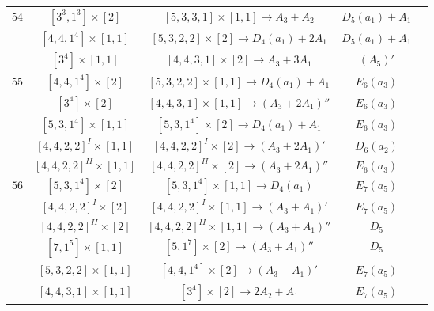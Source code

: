 \documentclass[reqno,12pt]{amsart}
\numberwithin{equation}{section}
\theoremstyle{plain}
\theoremstyle{definition}
\begin{document}
\begin{table}[htbp]
{\begin{tabular}{|c|c|c|c|c|}
$54$ 
&  $ [3^3,1^3]\times [2]$  & \small{$[5,3,3,1]\times [1,1]\rightarrow  A_3+A_2$  }&   $D_5(a_1)+A_1$ \\
&  $ [4,4,1^4]\times [1,1]$  & \small{$[5,3,2,2]\times [2]\rightarrow  D_4(a_1)+2A_1$  }&   $D_5(a_1)+A_1$ \\
&  $ [3^4]\times [1,1]$  & \small{$[4,4,3,1]\times [2]\rightarrow  A_3+3A_1$  }&   $(A_5)'$ \\
\hline

$55$ 
&  $ [4,4,1^4]\times [2]$  & \small{$[5,3,2,2]\times [1,1]\rightarrow  D_4(a_1)+A_1$ }&   $E_6(a_3)$ \\
&  $ [3^4]\times [2]$  & \small{$[4,4,3,1]\times [1,1]\rightarrow  (A_3+2A_1)''$  }&   $E_6(a_3)$ \\
&  $ [5,3,1^4]\times [1,1]$  & \small{$[5,3,1^4]\times [2]\rightarrow  D_4(a_1)+A_1$  }&   $E_6(a_3)$ \\

& \footnotesize{   $ [4,4,2,2]^{I}\times [1,1]$} & \small{$[4,4,2,2]^{I}\times [2]\rightarrow  (A_3+2A_1)'$ }&   $D_6(a_2)$ \\
& \footnotesize{   $ [4,4,2,2]^{II}\times [1,1]$ }& \small{$[4,4,2,2]^{II}\times [2]\rightarrow  (A_3+2A_1)''$ }&   $E_6(a_3)$ \\
\hline

$56$ 
&  $ [5,3,1^4]\times [2]$  & \small{$[5,3,1^4]\times [1,1]\rightarrow  D_4(a_1)$  }&   $E_7(a_5)$ \\
& \footnotesize{  $ [4,4,2,2]^{I}\times [2]$ }& \small{$[4,4,2,2]^I\times [1,1]\rightarrow  (A_3+A_1)'$ }&   $E_7(a_5)$ \\
& \footnotesize{  $ [4,4,2,2]^{II}\times [2]$ } & \small{$[4,4,2,2]^{II}\times [1,1]\rightarrow  (A_3+A_1)''$ }&   $D_5$ \\
&  $ [7,1^5]\times [1,1]$  & \small{$[5,1^7]\times [2]\rightarrow  (A_3+A_1)''$  }&   $D_5$ \\
&  $ [5,3,2,2]\times [1,1]$  & \small{$[4,4,1^4]\times [2]\rightarrow (A_3+A_1)'$  }&   $E_7(a_5)$ \\
&  $ [4,4,3,1]\times [1,1]$  & \small{$[3^4]\times [2]\rightarrow 2A_2+A_1$}&   $E_7(a_5)$ \\
\hline





\end{tabular}}
	\bigskip
	
\end{table}
\end{document}
